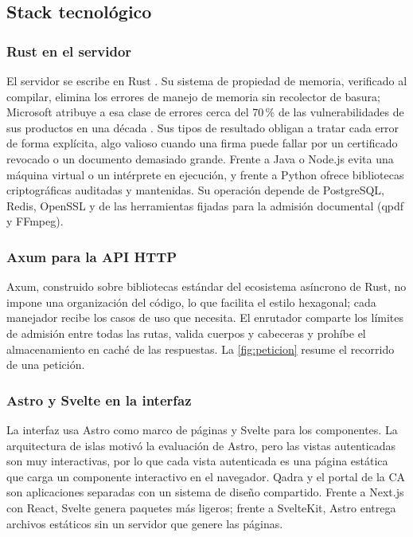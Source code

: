 \subsection{Stack tecnológico}\label{sec:stack-tecnologico}

\subsubsection{Rust en el servidor}\label{sec:rust-backend}

El servidor se escribe en Rust \cite{klabnik2023}. Su sistema de propiedad de memoria, verificado al compilar, elimina los errores de manejo de memoria sin recolector de basura; Microsoft atribuye a esa clase de errores cerca del 70\,\% de las vulnerabilidades de sus productos en una década \cite{msrc2019}. Sus tipos de resultado obligan a tratar cada error de forma explícita, algo valioso cuando una firma puede fallar por un certificado revocado o un documento demasiado grande. Frente a Java o Node.js evita una máquina virtual o un intérprete en ejecución, y frente a Python ofrece bibliotecas criptográficas auditadas y mantenidas. Su operación depende de PostgreSQL, Redis, OpenSSL y de las herramientas fijadas para la admisión documental (qpdf y FFmpeg).

\subsubsection{Axum para la API HTTP}\label{sec:axum}

Axum, construido sobre bibliotecas estándar del ecosistema asíncrono de Rust, no impone una organización del código, lo que facilita el estilo hexagonal; cada manejador recibe los casos de uso que necesita. El enrutador comparte los límites de admisión entre todas las rutas, valida cuerpos y cabeceras y prohíbe el almacenamiento en caché de las respuestas. La \cref{fig:peticion} resume el recorrido de una petición.

\subsubsection{Astro y Svelte en la interfaz}\label{sec:frontend-astro}

La interfaz usa Astro como marco de páginas y Svelte para los componentes. La arquitectura de islas \cite{sylormiller2019} motivó la evaluación de Astro, pero las vistas autenticadas son muy interactivas, por lo que cada vista autenticada es una página estática que carga un componente interactivo en el navegador. Qadra y el portal de la CA son aplicaciones separadas con un sistema de diseño compartido. Frente a Next.js con React, Svelte genera paquetes más ligeros; frente a SvelteKit, Astro entrega archivos estáticos sin un servidor que genere las páginas.

